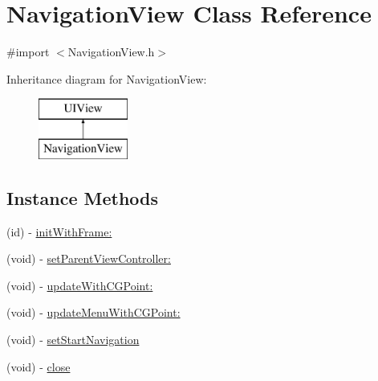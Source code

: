 \hypertarget{interface_navigation_view}{\section{Navigation\-View Class Reference}
\label{interface_navigation_view}
}


{\ttfamily \#import $<$Navigation\-View.\-h$>$}

Inheritance diagram for Navigation\-View\-:\begin{figure}[H]
\begin{center}
\leavevmode
\includegraphics[height=2.000000cm]{interface_navigation_view}
\end{center}
\end{figure}
\subsection*{Instance Methods}
\begin{DoxyCompactItemize}
\item 
(id) -\/ \hyperlink{interface_navigation_view_a56af61e037170b86e41e802e9bb44d8c}{init\-With\-Frame\-:}
\item 
(void) -\/ \hyperlink{interface_navigation_view_aba82fa0d42762ba7cb69e9e4ecccc9ad}{set\-Parent\-View\-Controller\-:}
\item 
(void) -\/ \hyperlink{interface_navigation_view_a12956863cd21f0f3d26acd5b5e32b2ce}{update\-With\-C\-G\-Point\-:}
\item 
(void) -\/ \hyperlink{interface_navigation_view_ac4bb7bb4440d13d26a995bc7065e8ae9}{update\-Menu\-With\-C\-G\-Point\-:}
\item 
(void) -\/ \hyperlink{interface_navigation_view_ad361cc39388edaf2dcac94d0355dd025}{set\-Start\-Navigation}
\item 
(void) -\/ \hyperlink{interface_navigation_view_a417bf658f542ae9a5c6e8c9af24c5a6f}{close}
\end{DoxyCompactItemize}


